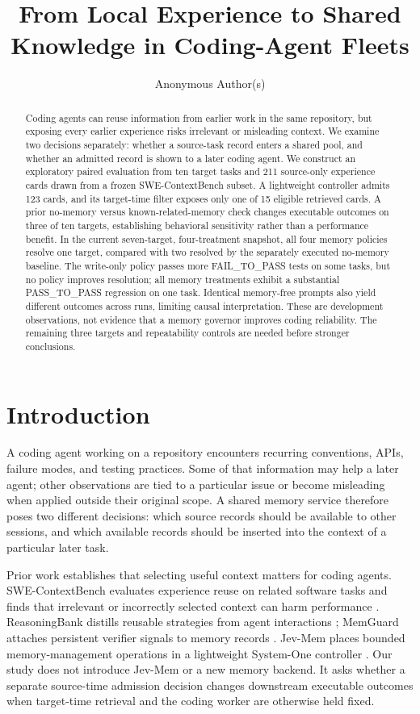 \documentclass[sigconf,anonymous]{aamas}
\title{From Local Experience to Shared Knowledge in Coding-Agent Fleets}
\author{Anonymous Author(s)}
\affiliation{\institution{Anonymous}}
\begin{document}
\begin{abstract}
Coding agents can reuse information from earlier work in the same repository, but exposing every earlier experience risks irrelevant or misleading context. We examine two decisions separately: whether a source-task record enters a shared pool, and whether an admitted record is shown to a later coding agent. We construct an exploratory paired evaluation from ten target tasks and 211 source-only experience cards drawn from a frozen SWE-ContextBench subset. A lightweight controller admits 123 cards, and its target-time filter exposes only one of 15 eligible retrieved cards. A prior no-memory versus known-related-memory check changes executable outcomes on three of ten targets, establishing behavioral sensitivity rather than a performance benefit. In the current seven-target, four-treatment snapshot, all four memory policies resolve one target, compared with two resolved by the separately executed no-memory baseline. The write-only policy passes more FAIL\_TO\_PASS tests on some tasks, but no policy improves resolution; all memory treatments exhibit a substantial PASS\_TO\_PASS regression on one task. Identical memory-free prompts also yield different outcomes across runs, limiting causal interpretation. These are development observations, not evidence that a memory governor improves coding reliability. The remaining three targets and repeatability controls are needed before stronger conclusions.
\end{abstract}
\maketitle

\section{Introduction}
A coding agent working on a repository encounters recurring conventions, APIs, failure modes, and testing practices. Some of that information may help a later agent; other observations are tied to a particular issue or become misleading when applied outside their original scope. A shared memory service therefore poses two different decisions: which source records should be available to other sessions, and which available records should be inserted into the context of a particular later task.

Prior work establishes that selecting useful context matters for coding agents. SWE-ContextBench evaluates experience reuse on related software tasks and finds that irrelevant or incorrectly selected context can harm performance \cite{zhu2026swecontext}. ReasoningBank distills reusable strategies from agent interactions \cite{ouyang2025reasoningbank}; MemGuard attaches persistent verifier signals to memory records \cite{wang2026memguard}. Jev-Mem places bounded memory-management operations in a lightweight System-One controller \cite{jiang2026jevmem}. Our study does not introduce Jev-Mem or a new memory backend. It asks whether a separate source-time admission decision changes downstream executable outcomes when target-time retrieval and the coding worker are otherwise held fixed.
\end{document}

